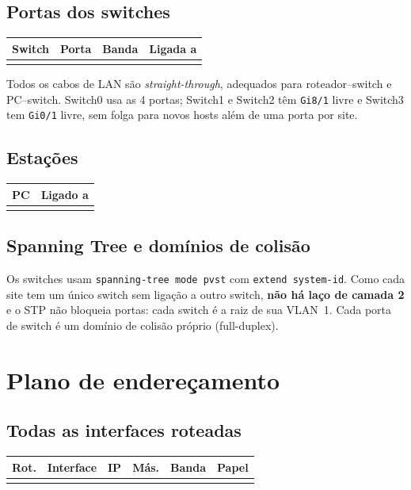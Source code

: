 \documentclass[12pt,a4paper]{article}
\begin{document}
\subsection{Portas dos switches}
\begin{longtable}{@{}llll@{}}\toprule
Switch & Porta & Banda & Ligada a\\\midrule\endhead
\\\bottomrule
\end{longtable}
Todos os cabos de LAN são \textit{straight-through}, adequados para roteador--switch e PC--switch. Switch0 usa as 4 portas; Switch1 e Switch2 têm \texttt{Gi8/1} livre e Switch3 tem \texttt{Gi0/1} livre, sem folga para novos hosts além de uma porta por site.

\subsection{Estações}
\begin{longtable}{@{}ll@{}}\toprule
PC & Ligado a\\\midrule\endhead
\\\bottomrule
\end{longtable}

\subsection{Spanning Tree e domínios de colisão}
Os switches usam \texttt{spanning-tree mode pvst} com \texttt{extend system-id}. Como cada site tem um único switch sem ligação a outro switch, \textbf{não há laço de camada 2} e o STP não bloqueia portas: cada switch é a raiz de sua VLAN~1. Cada porta de switch é um domínio de colisão próprio (full-duplex).

\section{Plano de endereçamento}
\subsection{Todas as interfaces roteadas}
\begin{longtable}{@{}llllll@{}}\toprule
Rot. & Interface & IP & Más. & Banda & Papel\\\midrule\endhead
\\\bottomrule
\end{longtable}
\end{document}
